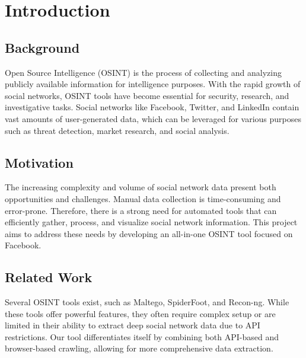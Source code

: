 \documentclass[13pt,a4paper]{report}
\begin{document}
\tableofcontents
\newpage

\chapter{Introduction}
\section{Background}
Open Source Intelligence (OSINT) is the process of collecting and analyzing publicly available information for intelligence purposes. With the rapid growth of social networks, OSINT tools have become essential for security, research, and investigative tasks. Social networks like Facebook, Twitter, and LinkedIn contain vast amounts of user-generated data, which can be leveraged for various purposes such as threat detection, market research, and social analysis.

\section{Motivation}
The increasing complexity and volume of social network data present both opportunities and challenges. Manual data collection is time-consuming and error-prone. Therefore, there is a strong need for automated tools that can efficiently gather, process, and visualize social network information. This project aims to address these needs by developing an all-in-one OSINT tool focused on Facebook.

\section{Related Work}
Several OSINT tools exist, such as Maltego, SpiderFoot, and Recon-ng. While these tools offer powerful features, they often require complex setup or are limited in their ability to extract deep social network data due to API restrictions. Our tool differentiates itself by combining both API-based and browser-based crawling, allowing for more comprehensive data extraction.
\end{document}
